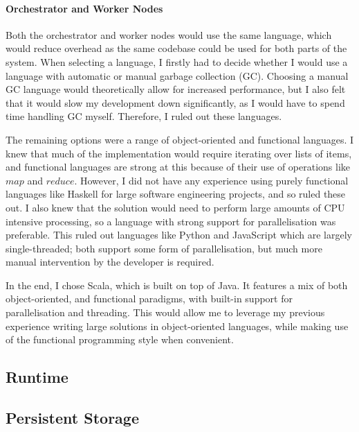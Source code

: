 \paragraph{Orchestrator and Worker Nodes}
Both the orchestrator and worker nodes would use the same language, which would reduce overhead as the same codebase could be used for both parts of the system. When selecting a language, I firstly had to decide whether I would use a language with automatic or manual garbage collection (GC). Choosing a manual GC language would theoretically allow for increased performance, but I also felt that it would slow my development down significantly, as I would have to spend time handling GC myself. Therefore, I ruled out these languages.

The remaining options were a range of object-oriented and functional languages. I knew that much of the implementation would require iterating over lists of items, and functional languages are strong at this because of their use of operations like $map$ and $reduce$. However, I did not have any experience using purely functional languages like Haskell for large software engineering projects, and so ruled these out. I also knew that the solution would need to perform large amounts of CPU intensive processing, so a language with strong support for parallelisation was preferable. This ruled out languages like Python and JavaScript which are largely single-threaded; both support some form of parallelisation, but much more manual intervention by the developer is required.

In the end, I chose Scala, which is built on top of Java. It features a mix of both object-oriented, and functional paradigms, with built-in support for parallelisation and threading. This would allow me to leverage my previous experience writing large solutions in object-oriented languages, while making use of the functional programming style when convenient. 
\subsection{Runtime}


\subsection{Persistent Storage}
